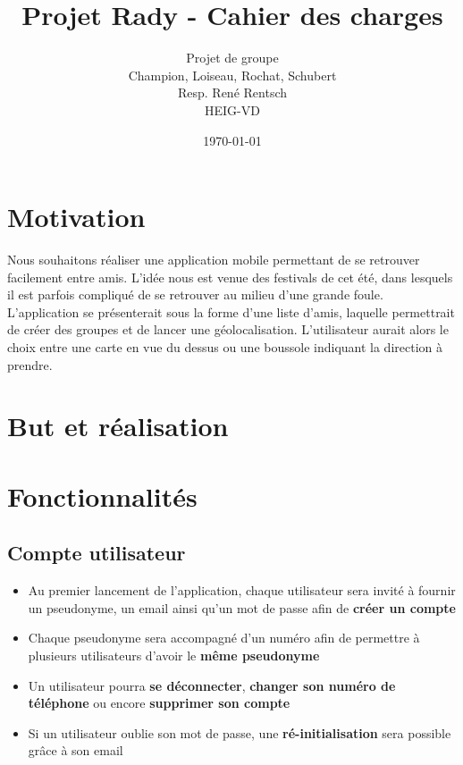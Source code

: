 \documentclass[french]{article}
\begin{document}
	
	\title{Projet Rady - Cahier des charges}
	\author{Projet de groupe\\
		Champion, Loiseau, Rochat, Schubert\\
		Resp. René Rentsch\\
		HEIG-VD}
	\date{\today}
	\maketitle
	
	\tableofcontents
	
	\justify
	
	\section{Motivation}
		 Nous souhaitons réaliser une application mobile permettant de se retrouver facilement entre amis. L’idée nous est venue des festivals de cet été, dans lesquels il est parfois compliqué de se retrouver au milieu d’une grande foule. L’application se présenterait sous la forme d’une liste d’amis, laquelle permettrait de créer des groupes et de lancer une géolocalisation. L’utilisateur aurait alors le choix entre une carte en vue du dessus ou une boussole indiquant la direction à
		 prendre.
	
	\section{But et réalisation}
		
	
	\section{Fonctionnalités}
	
		\subsection{Compte utilisateur}
			\begin{itemize}
				\item Au premier lancement de l'application, chaque utilisateur sera invité à fournir un pseudonyme, un email ainsi qu'un mot de passe afin de \textbf{créer un compte} 
				\item Chaque pseudonyme sera accompagné d'un numéro afin de permettre à plusieurs utilisateurs d'avoir le \textbf{même pseudonyme}
				\item Un utilisateur pourra \textbf{se déconnecter}, \textbf{changer son numéro de téléphone} ou encore \textbf{supprimer son compte}
				\item Si un utilisateur oublie son mot de passe, une \textbf{ré-initialisation} sera possible grâce à son email
			\end{itemize}
	
\end{document}
